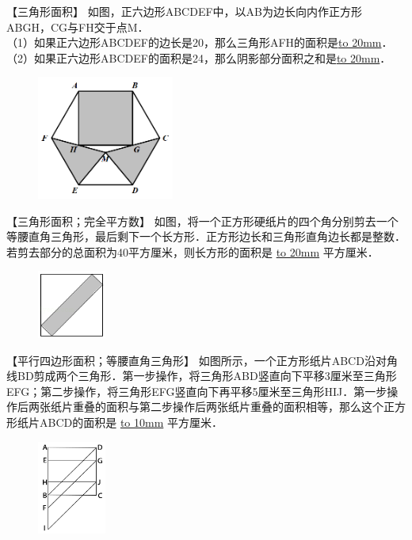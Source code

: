\item {
    【三角形面积】
    如图，正六边形ABCDEF中，以AB为边长向内作正方形ABGH，CG与FH交于点M．\\
    （1）如果正六边形ABCDEF的边长是20，那么三角形AFH的面积是\underline{\hbox to 20mm{}}．\\
    （2）如果正六边形ABCDEF的面积是24，那么阴影部分面积之和是\underline{\hbox to 20mm{}}．
    \begin{figure}[H] 
        \centering
        \includegraphics[width=0.4\textwidth]{./pics/Chapter_3/3.png}
    \end{figure}
    \vspace{1cm}
}
\item {
    【三角形面积；完全平方数】
    {如图，将一个正方形硬纸片的四个角分别剪去一个等腰直角三角形，最后剩下一个长方形．正方形边长和三角形直角边长都是整数．若剪去部分的总面积为40平方厘米，则长方形的面积是 \underline{\hbox to 20mm{}} 平方厘米．} 
    \begin{figure}[H] 
        \centering
        \includegraphics[width=0.2\textwidth]{./pics/Chapter_3/12.png}
    \end{figure}
    \vspace{1cm}
}


\item {
    【平行四边形面积；等腰直角三角形】
    {如图所示，一个正方形纸片ABCD沿对角线BD剪成两个三角形．第一步操作，将三角形ABD竖直向下平移3厘米至三角形EFG；第二步操作，将三角形EFG竖直向下再平移5厘米至三角形HIJ．第一步操作后两张纸片重叠的面积与第二步操作后两张纸片重叠的面积相等，那么这个正方形纸片ABCD的面积是 \underline{\hbox to 10mm{}} 平方厘米．} 
    \begin{figure}[H] 
        \centering
        \includegraphics[width=0.2\textwidth]{./pics/Chapter_3/10.png}
    \end{figure}
    \vspace{1cm}
}

